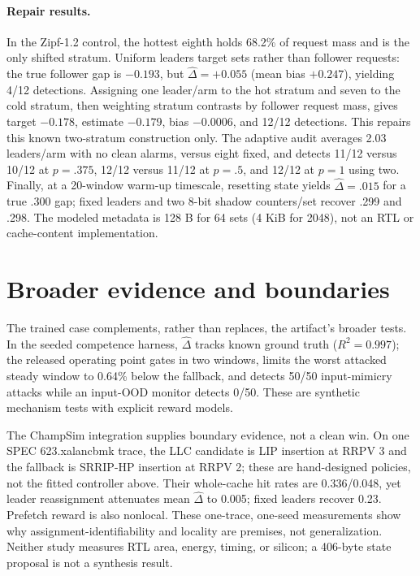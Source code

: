 \documentclass{article}
\newcommand{\dhat}{\hat{\Delta}}
\begin{document}
\paragraph{Repair results.}
In the Zipf-1.2 control, the hottest eighth holds 68.2\% of request mass and is
the only shifted stratum.  Uniform leaders target sets rather than follower
requests: the true follower gap is $-0.193$, but $\dhat=+0.055$ (mean bias
$+0.247$), yielding 4/12 detections.  Assigning one leader/arm to the hot
stratum and seven to the cold stratum, then weighting stratum contrasts by
follower request mass, gives target $-0.178$, estimate $-0.179$, bias $-0.0006$,
and 12/12 detections.  This repairs this known two-stratum construction only.
The adaptive audit averages 2.03 leaders/arm with no clean alarms, versus eight
fixed, and detects 11/12 versus 10/12 at $p=.375$, 12/12 versus 11/12 at $p=.5$,
and 12/12 at $p=1$ using two.  Finally, at a 20-window warm-up timescale,
resetting state yields $\dhat=.015$ for a true .300 gap; fixed leaders and two
8-bit shadow counters/set recover .299 and .298.  The modeled metadata is 128 B
for 64 sets (4 KiB for 2048), not an RTL or cache-content implementation.

\section{Broader evidence and boundaries}

The trained case complements, rather than replaces, the artifact's broader
tests.  In the seeded competence harness, $\dhat$ tracks known ground truth
($R^2=0.997$); the released operating point gates in two windows, limits the
worst attacked steady window to 0.64\% below the fallback, and detects 50/50
input-mimicry attacks while an input-OOD monitor detects 0/50.  These are
synthetic mechanism tests with explicit reward models.

The ChampSim integration supplies boundary evidence, not a clean win.  On one
SPEC 623.xalancbmk trace, the LLC candidate is LIP insertion at RRPV 3 and the
fallback is SRRIP-HP insertion at RRPV 2; these are hand-designed policies, not
the fitted controller above.  Their whole-cache hit rates are 0.336/0.048, yet
leader reassignment attenuates mean $\dhat$ to 0.005; fixed leaders recover 0.23.
Prefetch reward is also nonlocal.  These one-trace, one-seed measurements show
why assignment-identifiability and locality are premises, not generalization.
Neither study measures RTL area, energy, timing, or silicon; a 406-byte state
proposal is not a synthesis result.
\end{document}
